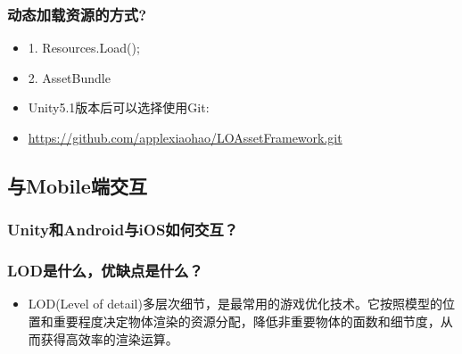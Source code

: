 \documentclass[9pt, b5paper]{article}
\begin{document}
\subsubsection{动态加载资源的方式?}
\label{sec:org8efbff5}
\begin{itemize}
\item 1. Resources.Load();
\item 2. AssetBundle
\item Unity5.1版本后可以选择使用Git:
\item \url{https://github.com/applexiaohao/LOAssetFramework.git}
\end{itemize}


\subsection{与Mobile端交互}
\label{sec:org8851516}
\subsubsection{Unity和Android与iOS如何交互？}
\label{sec:orgda91c0d}
\subsubsection{LOD是什么，优缺点是什么？}
\label{sec:org24b5165}
\begin{itemize}
\item LOD(Level of detail)多层次细节，是最常用的游戏优化技术。它按照模型的位置和重要程度决定物体渲染的资源分配，降低非重要物体的面数和细节度，从而获得高效率的渲染运算。
\end{itemize}
\end{document}
